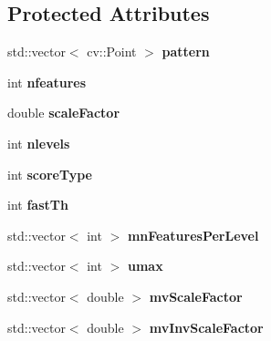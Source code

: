 \subsection*{Protected Attributes}
\begin{DoxyCompactItemize}
\item 
std\+::vector$<$ cv\+::\+Point $>$ {\bfseries pattern}\hypertarget{classORBextractor_a97a32d109f922387c28f5b1935248143}{}\label{classORBextractor_a97a32d109f922387c28f5b1935248143}

\item 
int {\bfseries nfeatures}\hypertarget{classORBextractor_af3b97911474d38b1940b86fbe98b1950}{}\label{classORBextractor_af3b97911474d38b1940b86fbe98b1950}

\item 
double {\bfseries scale\+Factor}\hypertarget{classORBextractor_a281a6a438940caf9f0c2366a9103ca3d}{}\label{classORBextractor_a281a6a438940caf9f0c2366a9103ca3d}

\item 
int {\bfseries nlevels}\hypertarget{classORBextractor_a443288adfa27cb108a89af883477914e}{}\label{classORBextractor_a443288adfa27cb108a89af883477914e}

\item 
int {\bfseries score\+Type}\hypertarget{classORBextractor_a2e5bc2b746121ded921a626888dd2f62}{}\label{classORBextractor_a2e5bc2b746121ded921a626888dd2f62}

\item 
int {\bfseries fast\+Th}\hypertarget{classORBextractor_aa9872940b82997452bbdcf9142631e04}{}\label{classORBextractor_aa9872940b82997452bbdcf9142631e04}

\item 
std\+::vector$<$ int $>$ {\bfseries mn\+Features\+Per\+Level}\hypertarget{classORBextractor_ac3d3f1a3b6e33fd049bd5f3e72a9acc1}{}\label{classORBextractor_ac3d3f1a3b6e33fd049bd5f3e72a9acc1}

\item 
std\+::vector$<$ int $>$ {\bfseries umax}\hypertarget{classORBextractor_a74ae6eae25b93a2a9476aedbc07816c0}{}\label{classORBextractor_a74ae6eae25b93a2a9476aedbc07816c0}

\item 
std\+::vector$<$ double $>$ {\bfseries mv\+Scale\+Factor}\hypertarget{classORBextractor_a8ece9ed69908f8b10346fb65e3dfe174}{}\label{classORBextractor_a8ece9ed69908f8b10346fb65e3dfe174}

\item 
std\+::vector$<$ double $>$ {\bfseries mv\+Inv\+Scale\+Factor}\hypertarget{classORBextractor_a78a489192a93bbc99fc9c30d96311283}{}\label{classORBextractor_a78a489192a93bbc99fc9c30d96311283}


\end{DoxyCompactItemize}
